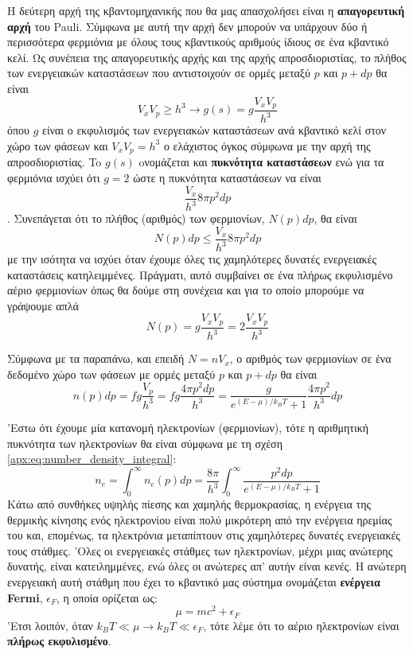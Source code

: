 Η δεύτερη αρχή της κβαντομηχανικής που θα μας απασχολήσει είναι η \textbf{απαγορευτική αρχή} του Pauli. Σύμφωνα με αυτή την αρχή δεν μπορούν να υπάρχουν δύο ή περισσότερα φερμιόνια με όλους τους κβαντικούς αριθμούς ίδιους σε ένα κβαντικό κελί. Ως συνέπεια της απαγορευτικής αρχής και της αρχής απροσδιοριστίας, το πλήθος των ενεργειακών καταστάσεων που αντιστοιχούν σε ορμές μεταξύ $p$ και $p + dp$ θα είναι
$$V_x V_p \geq h^3 \longrightarrow g(s) = g\frac{V_x V_p}{h^3}$$
όπου $g$ είναι ο εκφυλισμός των ενεργειακών καταστάσεων ανά κβαντικό κελί στον χώρο των φάσεων και $V_x V_p = h^3$ ο ελάχιστος όγκος σύμφωνα με την αρχή της απροσδιοριστίας. To $g(s)$ oνομάζεται και \textbf{πυκνότητα καταστάσεων} ενώ για τα φερμιόνια ισχύει ότι $g=2$ ώστε η πυκνότητα καταστάσεων να είναι
$$ \frac{V_x}{h^3} 8 \pi p^2dp $$. Συνεπάγεται ότι το πλήθος (αριθμός) των φερμιονίων, $N(p)dp$, θα είναι
$$N(p)dp \leq \frac{V_x}{h^3} 8 \pi p^2dp $$
με την ισότητα να ισχύει όταν έχουμε όλες τις χαμηλότερες δυνατές ενεργειακές καταστάσεις κατηλειμμένες. Πράγματι, αυτό συμβαίνει σε ένα πλήρως εκφυλισμένο αέριο φερμιονίων όπως θα δούμε στη συνέχεια και για το οποίο μπορούμε να γράψουμε απλά
$$N(p) = g \frac{V_x V_p}{h^3} = 2 \frac{V_x V_p}{h^3}$$

Σύμφωνα με τα παραπάνω, και επειδή $N = n V_x$, ο αριθμός των φερμιονίων σε ένα δεδομένο χώρο των φάσεων με ορμές μεταξύ $p$ και $p + dp$ θα είναι
\begin{equation}
    n(p) dp = f g \frac{V_p}{h^3} = f g \frac{4\pi p^2 dp}{h^3} = \frac{g}{e^{(E - \mu)/k_B T} + 1} \frac{4\pi p^2}{h^3} dp
\end{equation}

'Εστω ότι έχουμε μία κατανομή ηλεκτρονίων (φερμιονίων), τότε η αριθμητική πυκνότητα των ηλεκτρονίων θα είναι σύμφωνα με τη σχέση \eqref{apx:eq:number_density_integral}:
\begin{equation}
    n_e = \int_0^{\infty} n_e (p) dp =  \frac{8\pi}{h^3} \int_0^{\infty} \frac{p^2 dp}{e^{(E - \mu)/k_B T} + 1}
\end{equation}
Κάτω από συνθήκες υψηλής πίεσης και χαμηλής θερμοκρασίας, η ενέργεια της θερμικής κίνησης ενός ηλεκτρονίου είναι πολύ μικρότερη από την ενέργεια ηρεμίας του και, επομένως, τα ηλεκτρόνια μεταπίπτουν στις χαμηλότερες δυνατές ενεργειακές τους στάθμες. 'Ολες οι ενεργειακές στάθμες των ηλεκτρονίων, μέχρι μιας ανώτερης δυνατής, είναι κατειλημμένες, ενώ όλες οι ανώτερες απ' αυτήν είναι κενές. Η ανώτερη ενεργειακή αυτή στάθμη που έχει το κβαντικό μας σύστημα ονομάζεται \textbf{ενέργεια Fermi}, $\epsilon_F$, η οποία ορίζεται ως:
$$\mu = mc^2 + \epsilon_F$$
'Ετσι λοιπόν, όταν $k_B T \ll \mu \rightarrow k_B T \ll \epsilon_F$, τότε λέμε ότι το αέριο ηλεκτρονίων είναι \textbf{πλήρως εκφυλισμένο}.

